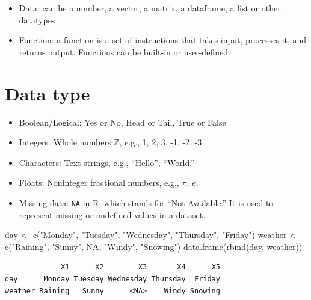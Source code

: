 \documentclass[
  letterpaper,
  DIV=11,
  numbers=noendperiod]{scrreprt}
\newenvironment{Shaded}{\begin{snugshade}}{\end{snugshade}}
\newcommand{\ConstantTok}[1]{\textcolor[rgb]{0.56,0.35,0.01}{#1}}
\newcommand{\FunctionTok}[1]{\textcolor[rgb]{0.28,0.35,0.67}{#1}}
\newcommand{\NormalTok}[1]{\textcolor[rgb]{0.00,0.23,0.31}{#1}}
\newcommand{\OtherTok}[1]{\textcolor[rgb]{0.00,0.23,0.31}{#1}}
\newcommand{\StringTok}[1]{\textcolor[rgb]{0.13,0.47,0.30}{#1}}
\begin{document}
\begin{itemize}
\item
  Data: can be a number, a vector, a matrix, a dataframe, a list or
  other datatypes
\item
  Function: a function is a set of instructions that takes input,
  processes it, and returns output. Functions can be built-in or
  user-defined.
\end{itemize}

\section{Data type}\label{data-type}

\begin{itemize}
\item
  Boolean/Logical: Yes or No, Head or Tail, True or False
\item
  Integers: Whole numbers \(\mathbb{Z}\), e.g., 1, 2, 3, -1, -2, -3
\item
  Characters: Text strings, e.g., ``Hello'', ``World.''
\item
  Floats: Noninteger fractional numbers, e.g., \(\pi\), \(e\).
\item
  Missing data: \texttt{NA} in R, which stands for ``Not Available.'' It
  is used to represent missing or undefined values in a dataset.
\end{itemize}

\begin{Shaded}
\begin{Highlighting}[]
\NormalTok{day }\OtherTok{\textless{}{-}} \FunctionTok{c}\NormalTok{(}\StringTok{"Monday"}\NormalTok{, }\StringTok{"Tuesday"}\NormalTok{, }\StringTok{"Wednesday"}\NormalTok{, }\StringTok{"Thursday"}\NormalTok{, }\StringTok{"Friday"}\NormalTok{)}
\NormalTok{weather }\OtherTok{\textless{}{-}} \FunctionTok{c}\NormalTok{(}\StringTok{"Raining"}\NormalTok{, }\StringTok{"Sunny"}\NormalTok{, }\ConstantTok{NA}\NormalTok{, }\StringTok{"Windy"}\NormalTok{, }\StringTok{"Snowing"}\NormalTok{)}
\FunctionTok{data.frame}\NormalTok{(}\FunctionTok{rbind}\NormalTok{(day, weather))}
\end{Highlighting}
\end{Shaded}

\begin{verbatim}
             X1      X2        X3       X4      X5
day      Monday Tuesday Wednesday Thursday  Friday
weather Raining   Sunny      <NA>    Windy Snowing
\end{verbatim}
\end{document}

